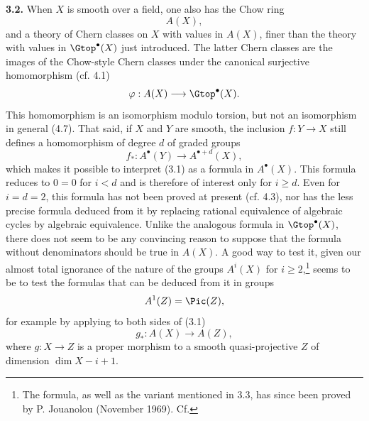 \textbf{3.2.} When $X$ is smooth over a field, one also has the Chow ring
\[
  A(X),
\]
and a theory of Chern classes on $X$ with values in $A(X)$, finer than the theory with values in $\Gtop^\bullet(X)$ just introduced. The latter Chern classes are the images of the Chow-style Chern classes under the canonical surjective homomorphism (cf. 4.1)
\[
  \varphi:A(X)\longrightarrow\Gtop^\bullet(X).
\]
This homomorphism is an isomorphism modulo torsion, but not an isomorphism in general (4.7). That said, if $X$ and $Y$ are smooth, the inclusion $f:Y\to X$ still defines a homomorphism of degree $d$ of graded groups
\[
  f_*:A^\bullet(Y)\longrightarrow A^{\bullet+d}(X),
\]
which makes it possible to interpret (3.1) as a formula in $A^\bullet(X)$. This formula reduces to $0=0$ for $i<d$ and is therefore of interest only for $i\geq d$. Even for $i=d=2$, this formula has not been proved at present (cf. 4.3), nor has the less precise formula deduced from it by replacing rational equivalence of algebraic cycles by algebraic equivalence. Unlike the analogous formula in $\Gtop^\bullet(X)$, there does not seem to be any convincing reason to suppose that the formula without denominators should be true in $A(X)$. A good way to test it, given our almost total ignorance of the nature of the groups $A^i(X)$ for $i\geq2$,\footnote{The formula, as well as the variant mentioned in 3.3, has since been proved by P. Jouanolou (November 1969). Cf.} seems to be to test the formulas that can be deduced from it in groups
\[
  A^1(Z)=\Pic(Z),
\]
for example by applying to both sides of (3.1)
\[
  g_*:A(X)\longrightarrow A(Z),
\]
where $g:X\to Z$ is a proper morphism to a smooth quasi-projective $Z$ of dimension $\dim X-i+1$.

